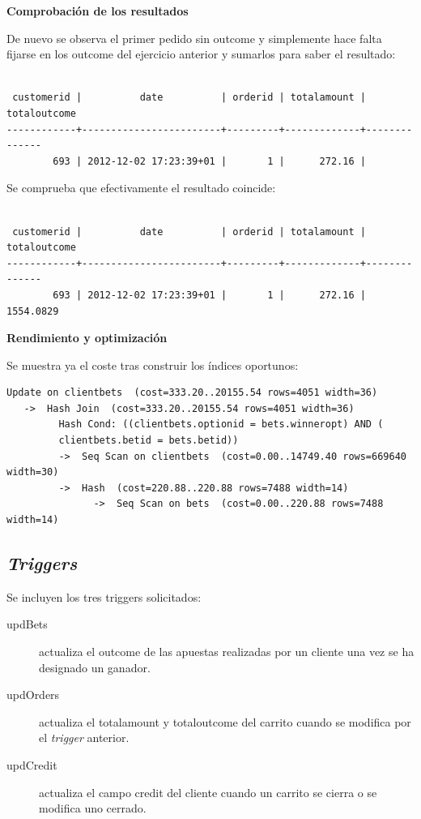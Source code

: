 \documentclass{article}
\begin{document}
\textbf{Comprobación de los resultados}

De nuevo se observa el primer pedido sin outcome y simplemente hace falta fijarse en los outcome del ejercicio anterior y sumarlos para saber el resultado:
\begin{lstlisting}[style=sql]

 customerid |          date          | orderid | totalamount | totaloutcome
------------+------------------------+---------+-------------+--------------
        693 | 2012-12-02 17:23:39+01 |       1 |      272.16 |
\end{lstlisting}
Se comprueba que efectivamente el resultado coincide:
\begin{lstlisting}[style=sql]

 customerid |          date          | orderid | totalamount | totaloutcome
------------+------------------------+---------+-------------+--------------
        693 | 2012-12-02 17:23:39+01 |       1 |      272.16 |    1554.0829
\end{lstlisting}
\newpage

\textbf{Rendimiento y optimización}

Se muestra ya el coste tras construir los índices oportunos:
\begin{lstlisting}[style=sql]
 Update on clientbets  (cost=333.20..20155.54 rows=4051 width=36)
   ->  Hash Join  (cost=333.20..20155.54 rows=4051 width=36)
         Hash Cond: ((clientbets.optionid = bets.winneropt) AND (
         clientbets.betid = bets.betid))
         ->  Seq Scan on clientbets  (cost=0.00..14749.40 rows=669640 width=30)
         ->  Hash  (cost=220.88..220.88 rows=7488 width=14)
               ->  Seq Scan on bets  (cost=0.00..220.88 rows=7488 width=14)
\end{lstlisting}

\subsection{\textit{Triggers}}
Se incluyen los tres triggers solicitados:
\begin{description}
    \item[updBets] actualiza el outcome de las apuestas realizadas por un cliente una vez se ha designado un ganador.
    \item[updOrders] actualiza el totalamount y totaloutcome del carrito cuando se modifica por el \textit{trigger} anterior.
    \item[updCredit] actualiza el campo credit del cliente cuando un carrito se cierra o se modifica uno cerrado.
\end{description}
\end{document}
